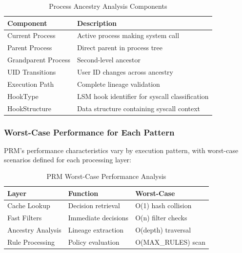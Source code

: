 \documentclass[conference]{IEEEtran}
\begin{document}
\begin{table}[htbp]
\centering
\caption{Process Ancestry Analysis Components}
\label{tab:ancestry}
\begin{tabular}{@{}p{2.5cm}p{5cm}@{}}
\toprule
\textbf{Component} & \textbf{Description} \\
\midrule
Current Process & Active process making system call \\
Parent Process & Direct parent in process tree \\
Grandparent Process & Second-level ancestor \\
UID Transitions & User ID changes across ancestry \\
Execution Path & Complete lineage validation \\
HookType & LSM hook identifier for syscall classification \\
HookStructure & Data structure containing syscall context \\
\bottomrule
\end{tabular}
\end{table}

\subsubsection{Worst-Case Performance for Each Pattern}
PRM's performance characteristics vary by execution pattern, with worst-case scenarios defined for each processing layer:

\begin{table}[htbp]
\centering
\caption{PRM Worst-Case Performance Analysis}
\label{tab:performance}
\begin{tabular}{@{}p{2cm}p{3cm}p{2.5cm}@{}}
\toprule
\textbf{Layer} & \textbf{Function} & \textbf{Worst-Case} \\
\midrule
Cache Lookup & Decision retrieval & O(1) hash collision \\
Fast Filters & Immediate decisions & O(n) filter checks \\
Ancestry Analysis & Lineage extraction & O(depth) traversal \\
Rule Processing & Policy evaluation & O(MAX\_RULES) scan \\
\bottomrule
\end{tabular}
\end{table}
\end{document}
